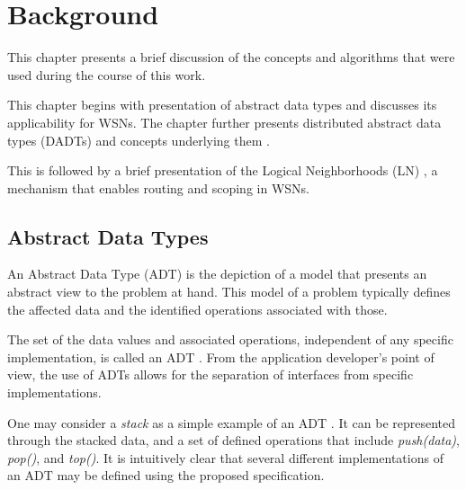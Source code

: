 \chapter{Background} \label{chap:background}


This chapter presents a brief discussion of the concepts and algorithms
that were used during the course of this work. 

This chapter begins with presentation of abstract data types and
discusses its applicability for WSNs. The chapter further presents distributed
abstract data types (DADTs) and concepts underlying them \cite{migliavacca_DADT:2006}.

This is followed by a brief presentation of the Logical Neighborhoods (LN) \cite{mottola_LNScoping:2006}, a mechanism that
enables routing and scoping in WSNs.  




\section{Abstract Data Types}

An Abstract Data Type (ADT) is the depiction of a model that
presents an abstract view to the problem at hand. This model of a problem
typically defines the affected data and the identified operations associated with
those.

The set of the data values and associated operations, independent of any
specific implementation, is called an ADT \cite{NIST_website}. From the
application developer's point of view, the use of ADTs allows for the separation of
interfaces from specific implementations.

One may consider a \emph{stack} as a simple example of an ADT
\cite{guttag_ADTs:1977}. It can be represented through the stacked data, and a set of defined
operations that include \emph{push(data)}, \emph{pop()}, and \emph{top()}. It is intuitively clear that
several different implementations of an ADT may be defined using the proposed specification.


